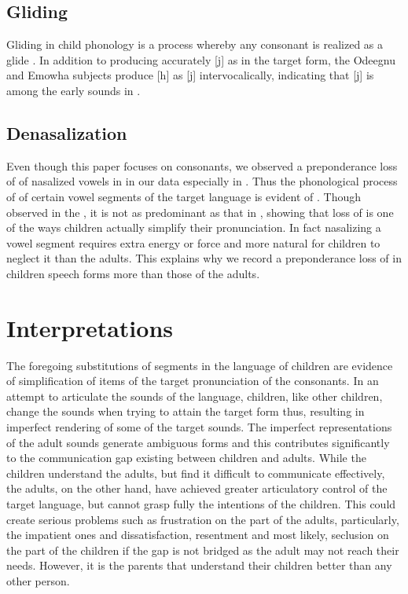 \documentclass[output=paper,
modfonts
]{langscibook}
\begin{document}
\subsection{Gliding}\label{sec:alerechi:1.13}

Gliding in child phonology is a process whereby any consonant is realized as a glide \citep[255]{Yul-Ifode2008}. In addition to producing accurately [j] as in the target form, the Odeegnu and Emowha subjects produce [h] as [j] intervocalically, indicating that [j] is among the early sounds in .

\subsection{Denasalization}\label{sec:alerechi:1.14}

Even though this paper focuses on consonants, we observed a preponderance loss of  of nasalized vowels in  in our data especially in . Thus the phonological process of  of certain vowel segments of the target language is evident of . Though \citet[249]{Alerechi2007a} observed  in the , it is not as predominant as that in , showing that loss of  is one of the ways children actually simplify their pronunciation. In fact nasalizing a vowel segment requires extra energy or force and more natural for children to neglect it than the adults. This explains why we record a preponderance loss of  in children speech forms more than those of the adults.

\section{Interpretations}\label{sec:alerechi:2}

The foregoing substitutions of segments in the language of  children are evidence of simplification of items of the target pronunciation of the  consonants. In an attempt to articulate the sounds of the language,  children, like other children, change the sounds when trying to attain the target form thus, resulting in imperfect rendering of some of the target sounds. The imperfect representations of the adult sounds generate ambiguous forms and this contributes significantly to the communication gap existing between children and adults. While the children understand the adults, but find it difficult to communicate effectively, the adults, on the other hand, have achieved greater articulatory control of the target language, but cannot grasp fully the intentions of the children. This could create serious problems such as frustration on the part of the adults, particularly, the impatient ones and dissatisfaction, resentment and most likely, seclusion on the part of the children if the gap is not bridged as the adult may not reach their needs. However, it is the parents that understand their children better than any other person. 
\end{document}
